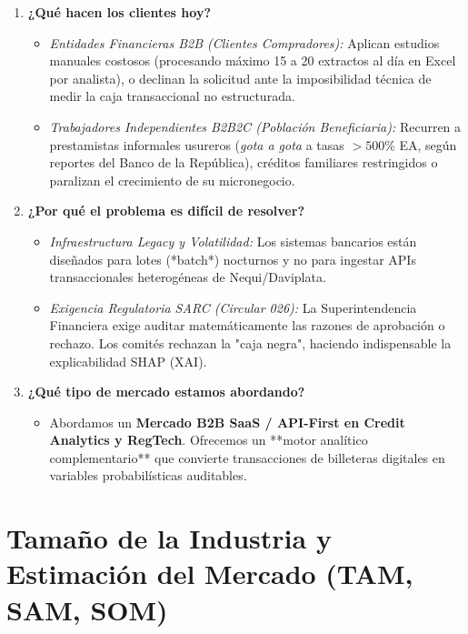 \documentclass[11pt,a4paper]{article}
\begin{document}
\begin{enumerate}[leftmargin=*]
    \item \textbf{¿Qué hacen los clientes hoy?}
    \begin{itemize}
        \item \textit{Entidades Financieras B2B (Clientes Compradores):} Aplican estudios manuales costosos (procesando máximo 15 a 20 extractos al día en Excel por analista), o declinan la solicitud ante la imposibilidad técnica de medir la caja transaccional no estructurada.
        \item \textit{Trabajadores Independientes B2B2C (Población Beneficiaria):} Recurren a prestamistas informales usureros (\textit{gota a gota} a tasas $>500\%$ EA, según reportes del Banco de la República), créditos familiares restringidos o paralizan el crecimiento de su micronegocio.
    \end{itemize}
    
    \item \textbf{¿Por qué el problema es difícil de resolver?}
    \begin{itemize}
        \item \textit{Infraestructura Legacy y Volatilidad:} Los sistemas bancarios están diseñados para lotes (*batch*) nocturnos y no para ingestar APIs transaccionales heterogéneas de Nequi/Daviplata.
        \item \textit{Exigencia Regulatoria SARC (Circular 026):} La Superintendencia Financiera exige auditar matemáticamente las razones de aprobación o rechazo. Los comités rechazan la "caja negra", haciendo indispensable la explicabilidad SHAP (XAI).
    \end{itemize}
    
    \item \textbf{¿Qué tipo de mercado estamos abordando?}
    \begin{itemize}
        \item Abordamos un \textbf{Mercado B2B SaaS / API-First en Credit Analytics y RegTech}. Ofrecemos un **motor analítico complementario** que convierte transacciones de billeteras digitales en variables probabilísticas auditables.
    \end{itemize}
\end{enumerate}

\section{Tamaño de la Industria y Estimación del Mercado (TAM, SAM, SOM)}
\end{document}
